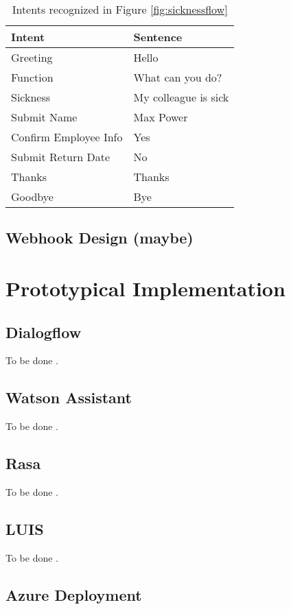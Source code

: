 \documentclass[12pt, backref]{report}
\begin{document}
\begin{table}
	\centering
	\begin{tabular}{ l || l }
		Intent & Sentence \\ \hline \hline
		Greeting & Hello \\ \hline
		Function & What can you do? \\ \hline
		Sickness & My colleague is sick \\ \hline
		Submit Name & Max Power \\ \hline
		Confirm Employee Info & Yes \\ \hline
		Submit Return Date & No \\ \hline
		Thanks & Thanks \\ \hline
		Goodbye & Bye \\ \hline
	\end{tabular}
	\caption{Intents recognized in Figure \ref{fig:sicknessflow}} \label{tab:sick_flow}
\end{table} \noindent

\section{Webhook Design (maybe)}


\chapter{Prototypical Implementation}    
\section{Dialogflow}
To be done \cite{dialogflowconcepts}.

\section{Watson Assistant}
To be done \cite{watsonapi}.
 
\section{Rasa}
To be done \cite{rasadocs}.

\section{LUIS}
To be done \cite{luisdocs}.


\section{Azure Deployment}
\end{document}

